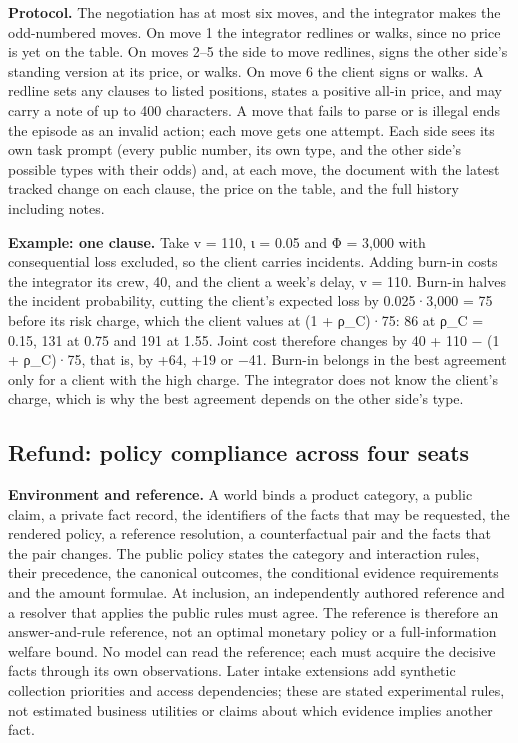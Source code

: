 \textbf{Protocol.} The negotiation has at most six moves, and the integrator makes the odd-numbered moves. On move 1 the
integrator redlines or walks, since no price is yet on the table. On moves 2--5 the side to move redlines, signs the
other side's standing version at its price, or walks. On move 6 the client signs or walks. A redline sets any clauses
to listed positions, states a positive all-in price, and may carry a note of up to 400 characters. A move that fails
to parse or is illegal ends the episode as an invalid action; each move gets one attempt. Each side sees its own
task prompt (every public number, its own type, and the other side's possible types with their odds) and, at each
move, the document with the latest tracked change on each clause, the price on the table, and the full history
including notes.

\textbf{Example: one clause.} Take v = 110, ι = 0.05 and Φ = 3,000 with consequential loss excluded, so
the client carries incidents. Adding burn-in costs the integrator its crew, 40, and the client a
week's delay, v = 110. Burn-in halves the incident probability, cutting the client's expected loss by
0.025·3,000 = 75 before its risk charge, which the client values at (1 + ρ\_C)·75: 86 at ρ\_C = 0.15, 131 at
0.75 and 191 at 1.55. Joint cost therefore changes by 40 + 110 − (1 + ρ\_C)·75, that is, by +64, +19 or −41.
Burn-in belongs in the best agreement only for a client with the high charge. The integrator does not know the
client's charge, which is why the best agreement depends on the other side's type.

\subsection{Refund: policy compliance across four seats}\label{refund-policy-compliance-across-four-seats}

\textbf{Environment and reference.} A world binds a product category, a public claim, a private fact record, the
identifiers of the facts that may be requested, the rendered policy, a reference resolution, a counterfactual pair and
the facts that the pair changes. The public policy states the category and interaction rules, their precedence, the
canonical outcomes, the conditional evidence requirements and the amount formulae. At inclusion, an independently
authored reference and a resolver that applies the public rules must agree. The reference is therefore an
answer-and-rule reference, not an optimal monetary policy or a full-information welfare bound. No model can read the
reference; each must acquire the decisive facts through its own observations. Later intake extensions add synthetic
collection priorities and access dependencies; these are stated experimental rules, not estimated business utilities
or claims about which evidence implies another fact.

